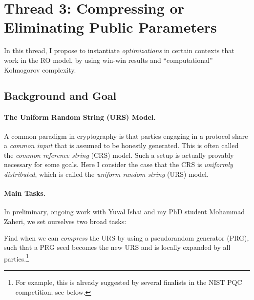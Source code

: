 
\section{Thread 3: Compressing  or Eliminating Public Parameters} \label{sec-elim}

In this thread, I propose to instantiate \emph{optimizations} in certain contexts that work in the RO model, by using win-win results and   ``computational'' Kolmogorov complexity.

\subsection{Background and Goal}

\paragraph*{The Uniform Random String (URS) Model.}
A common paradigm in cryptography is that parties engaging in a protocol share a \emph{common input} that is assumed to be honestly generated.  This is often called the \emph{common reference string} (CRS) model.   Such a setup is actually provably necessary for some goals. Here I consider the  case that the CRS is  \emph{uniformly distributed}, which is called the \emph{uniform random string} (URS) model.  




\paragraph*{Main Tasks.}
In preliminary, ongoing work with Yuval Ishai and my PhD student Mohammad Zaheri, we set ourselves two broad tasks:
\begin{task} 
Find when we can \emph{compress} the URS by using a pseudorandom generator (PRG), such that a PRG seed becomes the new URS and is locally expanded by all parties.\footnote{For example, this is already suggested by several finalists in the NIST PQC competition; see below.}  \label{ques-comp}
\end{task}

